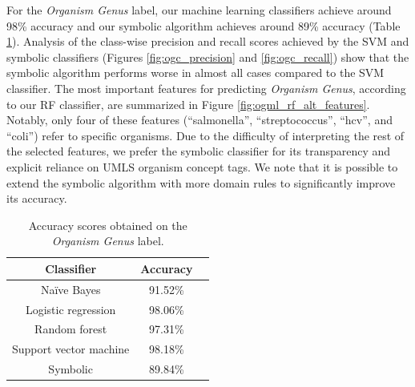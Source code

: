 \documentclass[sigconf]{acmart}
\newcommand{\naive}{Na\"ive }
\begin{document}
For the \textit{Organism Genus} label, our machine learning classifiers achieve around 98\% accuracy and our symbolic algorithm achieves around 89\% accuracy (Table \ref{tab:og_accuracies}). Analysis of the class-wise precision and recall scores achieved by the SVM and symbolic classifiers (Figures \ref{fig:ogc_precision} and \ref{fig:ogc_recall}) show that the symbolic algorithm performs worse in almost all cases compared to the SVM classifier. The most important features for predicting \textit{Organism Genus}, according to our RF classifier, are summarized in Figure \ref{fig:ogml_rf_alt_features}. Notably, only four of these features (``salmonella'', ``streptococcus'', ``hcv'', and ``coli'') refer to specific organisms. Due to the difficulty of interpreting the rest of the selected features, we prefer the symbolic classifier for its transparency and explicit reliance on UMLS organism concept tags. We note that it is possible to extend the symbolic algorithm with more domain rules to significantly improve its accuracy.

\begin{table}
    \caption{Accuracy scores obtained on the \textit{Organism Genus} label.}
    \label{tab:og_accuracies}
    
    \centering
    \begin{tabular}{ccc}
        \toprule
        Classifier & Accuracy \\
        \midrule
        \naive Bayes & 91.52\% \\
        Logistic regression & 98.06\% \\
        Random forest & 97.31\% \\
        Support vector machine & 98.18\% \\
        Symbolic & 89.84\% \\
        \bottomrule
    \end{tabular}
\end{table}
\end{document}

